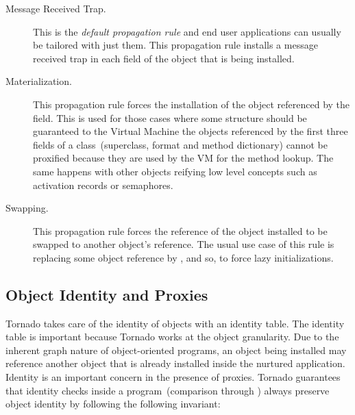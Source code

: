 \begin{description}
\item[Message Received Trap.] This is the \emph{default propagation rule} and end user applications can usually be tailored with just them. This propagation rule installs a message received trap in each field of the object that is being installed.
\item[Materialization.] This propagation rule forces the installation of the object referenced by the field. This is used for those cases where some structure should be guaranteed to the Virtual Machine \eg the objects referenced by the first three fields of a class~(superclass, format and method dictionary) cannot be proxified because they are used by the VM for the method lookup. The same happens with other objects reifying low level concepts such as activation records or semaphores.
\item[Swapping.] This propagation rule forces the reference of the object installed to be swapped to another object's reference. The usual use case of this rule is replacing some object reference by , and so, to force lazy initializations.
\end{description}

%
%

\subsection{Object Identity and Proxies}

Tornado takes care of the identity of objects with an identity table. The identity table is important because Tornado works at the object granularity. Due to the inherent graph nature of object-oriented programs, an object being installed may reference another object that is already installed inside the nurtured application.
Identity is an important concern in the presence of proxies. Tornado guarantees that identity checks inside a program~(\eg comparison through \ct{==}) always preserve object identity by following the following invariant: 

